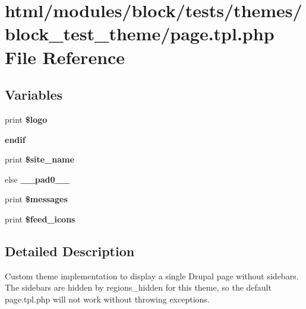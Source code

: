 \hypertarget{modules_2block_2tests_2themes_2block__test__theme_2page_8tpl_8php}{
\section{html/modules/block/tests/themes/block\_\-test\_\-theme/page.tpl.php File Reference}
\label{modules_2block_2tests_2themes_2block__test__theme_2page_8tpl_8php}
}
\subsection*{Variables}
\begin{DoxyCompactItemize}
\item 
\hypertarget{modules_2block_2tests_2themes_2block__test__theme_2page_8tpl_8php_a0fa695c12e5240657bb07a7742cf8391}{
print {\bfseries \$logo}}
\label{modules_2block_2tests_2themes_2block__test__theme_2page_8tpl_8php_a0fa695c12e5240657bb07a7742cf8391}

\item 
\hypertarget{modules_2block_2tests_2themes_2block__test__theme_2page_8tpl_8php_a82cd33ca97ff99f2fcc5e9c81d65251b}{
{\bfseries endif}}
\label{modules_2block_2tests_2themes_2block__test__theme_2page_8tpl_8php_a82cd33ca97ff99f2fcc5e9c81d65251b}

\item 
\hypertarget{modules_2block_2tests_2themes_2block__test__theme_2page_8tpl_8php_ad500e3900e86a2e78f15afbe44b1f849}{
print {\bfseries \$site\_\-name}}
\label{modules_2block_2tests_2themes_2block__test__theme_2page_8tpl_8php_ad500e3900e86a2e78f15afbe44b1f849}

\item 
\hypertarget{modules_2block_2tests_2themes_2block__test__theme_2page_8tpl_8php_a8e01dcc96c43199448ee66f7c2ae8ea6}{
else {\bfseries \_\-\_\-pad0\_\-\_\-}}
\label{modules_2block_2tests_2themes_2block__test__theme_2page_8tpl_8php_a8e01dcc96c43199448ee66f7c2ae8ea6}

\item 
\hypertarget{modules_2block_2tests_2themes_2block__test__theme_2page_8tpl_8php_a563294b2ecdb9ce8d9f8d20f680b5592}{
print {\bfseries \$messages}}
\label{modules_2block_2tests_2themes_2block__test__theme_2page_8tpl_8php_a563294b2ecdb9ce8d9f8d20f680b5592}

\item 
\hypertarget{modules_2block_2tests_2themes_2block__test__theme_2page_8tpl_8php_ab467b853777a9bfda790f67537c97eca}{
print {\bfseries \$feed\_\-icons}}
\label{modules_2block_2tests_2themes_2block__test__theme_2page_8tpl_8php_ab467b853777a9bfda790f67537c97eca}

\end{DoxyCompactItemize}


\subsection{Detailed Description}
Custom theme implementation to display a single Drupal page without sidebars. The sidebars are hidden by regions\_\-hidden for this theme, so the default page.tpl.php will not work without throwing exceptions. 